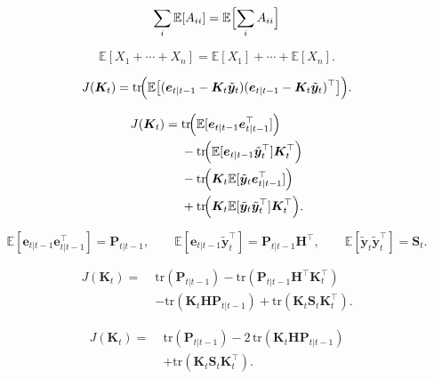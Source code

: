 
\[
\sum_i \mathbb{E}[A_{ii}]
= \mathbb{E}\Bigl[\sum_i A_{ii}\Bigr]
\]


\[
\mathbb{E}[X_1+\cdots+X_n]
= \mathbb{E}[X_1]+\cdots+\mathbb{E}[X_n].
\]



\[
J(\bm{K}_t)
= \mathrm{tr}\!\Bigl(
\mathbb{E}\bigl[
(\bm{e}_{t|t-1} - \bm{K}_t\tilde{\bm{y}}_t)
(\bm{e}_{t|t-1} - \bm{K}_t\tilde{\bm{y}}_t)^\top
\bigr]
\Bigr).
\]


\[
\begin{aligned}
J(\bm{K}_t)
=\;&
\mathrm{tr}\!\Bigl(
\mathbb{E}[\bm{e}_{t|t-1}\bm{e}_{t|t-1}^\top]
\Bigr) \\
&-
\mathrm{tr}\!\Bigl(
\mathbb{E}[\bm{e}_{t|t-1}\tilde{\bm{y}}_t^\top]\bm{K}_t^\top
\Bigr) \\
&-
\mathrm{tr}\!\Bigl(
\bm{K}_t\mathbb{E}[\tilde{\bm{y}}_t\bm{e}_{t|t-1}^\top]
\Bigr) \\
&+
\mathrm{tr}\!\Bigl(
\bm{K}_t\mathbb{E}[\tilde{\bm{y}}_t\tilde{\bm{y}}_t^\top]\bm{K}_t^\top
\Bigr).
\end{aligned}
\]


\[
\mathbb{E}[\bm{e}_{t|t-1}\bm{e}_{t|t-1}^\top] = \bm{P}_{t|t-1},
\qquad
\mathbb{E}[\bm{e}_{t|t-1}\tilde{\bm{y}}_t^\top] = \bm{P}_{t|t-1}\bm{H}^\top,
\qquad
\mathbb{E}[\tilde{\bm{y}}_t\tilde{\bm{y}}_t^\top] = \bm{S}_t.
\]


\[
\begin{aligned}
J(\bm{K}_t)
=\;&
\mathrm{tr}(\bm{P}_{t|t-1})
- \mathrm{tr}(\bm{P}_{t|t-1}\bm{H}^\top\bm{K}_t^\top) \\
&- \mathrm{tr}(\bm{K}_t\bm{H}\bm{P}_{t|t-1})
+ \mathrm{tr}(\bm{K}_t\bm{S}_t\bm{K}_t^\top).
\end{aligned}
\]


\[
\begin{aligned}
J(\bm{K}_t)
=\;&
\mathrm{tr}(\bm{P}_{t|t-1})
- 2\,\mathrm{tr}(\bm{K}_t\bm{H}\bm{P}_{t|t-1}) \\
&+ \mathrm{tr}(\bm{K}_t\bm{S}_t\bm{K}_t^\top).
\end{aligned}
\]

